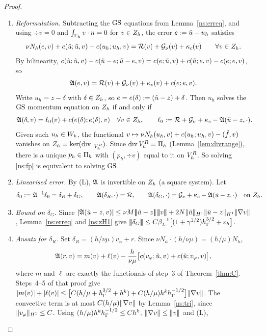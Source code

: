 \begin{proof}
\begin{enumerate}
\item \emph{Reformulation.} Subtracting the $\mathrm{GS}$ equations from Lemma~\ref{ns:erreq}, and using $\div v=0$ and $\int_{\Gamma_h}v\cdot n=0$ for $v\in Z_h$, the error $e:=\tilde u-u_h$ satisfies
\[
\nu N_h(e,v)+c(\tilde u;\tilde u,v)-c(u_h;u_h,v)=\mathcal R(v)+\mathcal G_\nu(v)+\kappa_c(v)\qquad\forall v\in Z_h .
\]
By bilinearity, $c(\tilde u;\tilde u,v)-c(\tilde u-e;\tilde u-e,v)=c(e;\tilde u,v)+c(\tilde u;e,v)-c(e;e,v)$, so
\[
\mathfrak A(e,v)=\mathcal R(v)+\mathcal G_\nu(v)+\kappa_c(v)+c(e;e,v).
\]
Write $u_h=z-\delta$ with $\delta\in Z_h$, so $e=e(\delta):=(\tilde u-z)+\delta$. Then $u_h$ solves the $\mathrm{GS}$ momentum equation on $Z_h$ if and only if
\begin{equation}\label{ns:fp}
\mathfrak A(\delta,v)=\ell_0(v)+c(e(\delta);e(\delta),v)\quad\forall v\in Z_h,\qquad \ell_0:=\mathcal R+\mathcal G_\nu+\kappa_c-\mathfrak A(\tilde u-z,\cdot).
\end{equation}
Given such $u_h\in W_h$, the functional $v\mapsto\nu N_h(u_h,v)+c(u_h;u_h,v)-(\tilde f,v)$ vanishes on $Z_h=\ker(\operatorname{div}|_{V_h^R})$. Since $\operatorname{div}V_h^R=\Pi_h$ (Lemma~\ref{lem:divrange}), there is a unique $p_h\in\Pi_h$ with $(p_h,\div v)$ equal to it on $V_h^R$. So solving \eqref{ns:fp} is equivalent to solving $\mathrm{GS}$.
\item \emph{Linearised error.} By (L), $\mathfrak A$ is invertible on $Z_h$ (a square system). Let
\begin{equation}\label{ns:delta0}
\delta_0:=\mathfrak A^{-1}\ell_0=\delta_R+\delta_G,\qquad \mathfrak A(\delta_R,\cdot)=\mathcal R,\qquad \mathfrak A(\delta_G,\cdot)=\mathcal G_\nu+\kappa_c-\mathfrak A(\tilde u-z,\cdot)\quad\text{on }Z_h .
\end{equation}
\item \emph{Bound on $\delta_G$.} Since $|\Aop(\ut-z,v)|\le\nu M\tnorm{\ut-z}\tnorm v+2N\norm{\ut}_{H^1}\norm{\ut-z}_{H^1}\norm{\nabla v}$, Lemma~\ref{ns:erreq} and \eqref{ns:zH1} give $|\!|\!|\delta_G|\!|\!|\le C\beta_L^{-1}\bigl[(1+\gamma^{1/2})h_\Gamma^{3/2}+\varepsilon_h\bigr]$.
\item \emph{Ansatz for $\delta_R$.} Set $\delta_R=(h/\nu\mu)v_\varphi+r$. Since $\nu N_h\cdot(h/\nu\mu)=(h/\mu)N_h$,
\[
\mathfrak A(r,v)=m(v)+\ell(v)-\frac{h}{\nu\mu}\bigl[c(v_\varphi;\tilde u,v)+c(\tilde u;v_\varphi,v)\bigr],
\]
where $m$ and $\ell$ are exactly the functionals of step~3 of Theorem~\ref{thm:C}. Steps~4--5 of that proof give $|m(v)|+|\ell(v)|\le\bigl[C(h/\mu+h_\Gamma^{3/2}+h^k)+C(h/\mu)h^kh_\Gamma^{-1/2}\bigr]\lVert \nabla v\rVert$. The convective term is at most $C(h/\mu)\lVert \nabla v\rVert$ by Lemma~\ref{ns:tri}, since $\lVert v_\varphi\rVert_{H^1}\le C$. Using $(h/\mu)h^kh_\Gamma^{-1/2}\le Ch^k$, $\lVert \nabla v\rVert\le|\!|\!|v|\!|\!|$ and (L),

\end{enumerate}
\end{proof}
